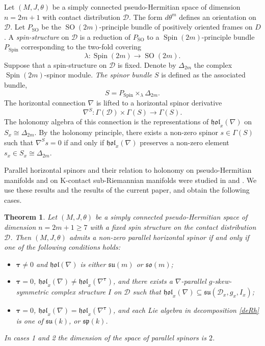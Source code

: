 \documentclass{amsart}
\theoremstyle{plain}
\newtheorem{theorem}{Theorem}[section]
\theoremstyle{definition}
\newcommand{\SO}{\operatorname{SO}}
\newcommand{\Spin}{\operatorname{Spin}}
\def\so{\mathfrak{so}}
\def\su{\mathfrak{su}}
\newcommand{\hol}{\mathfrak{hol}}
\newcommand{\bt}{{\boldsymbol{\tau}}}
\newcommand{\1}{\mathbf{1}}
\newcommand{\D}{{\mathcal D}}
\newcommand{\+}{\oplus}
\begin{document}
Let $(M,J,\theta)$ be a simply connected pseudo-Hermitian space of dimension $n=2m+1$ with contact distribution $\mathcal{D}$. 
The form $d\theta^m$ defines an orientation on $\D$. 
Let $P_{\SO}$ be the $\SO(2m)$-principle bundle of positively oriented frames on $D$.  
A {\it spin-structure} on $\D$ is a  reduction of $P_{\SO}$ to a $\Spin(2m)$-principle bundle $P_{\Spin}$ 
corresponding to the two-fold covering $$\lambda:\Spin(2m)\to\SO(2m).$$
Suppose that a spin-structure on $\D$ is fixed.
Denote by $\Delta_{2m}$ the complex 
$\Spin(2m)$-spinor module. {\it The spinor bundle} $S$  is defined as the associated bundle,
$$S=P_{\Spin}\times_\lambda \Delta_{2m}.$$
The horizontal connection $\nabla$ is lifted to a horizontal  spinor derivative
$$\nabla^S:\Gamma(\D)\times\Gamma(S)\to\Gamma(S).$$
The holonomy algebra of this connection is the representations of $\hol_x(\nabla)$ 
on $S_x\cong\Delta_{2m}$. By the holonomy principle, there exists a non-zero spinor 
$s\in \Gamma(S)$ such that $\nabla^S s=0$ if and only if $\hol_x(\nabla)$  preserves a non-zero element $s_x\in S_x\cong\Delta_{2m}$.

Parallel horizontal spinors and their relation to holonomy on pseudo-Hermitian manifolds and on K-contact sub-Riemannian manifolds 
were studied in \cite{Leitner18} and \cite{GalHolK}. We use these results and the results of the current paper, 
and obtain the following cases. 


\begin{theorem}\label{thparalspin} Let $(M,J,\theta)$ be a simply connected pseudo-Hermitian space of dimension $n=2m+1\geq 7$ 
	with a fixed spin structure on the contact distribution $\D$. 
	Then $(M,J,\theta)$ admits a non-zero parallel horizontal spinor if and only if one of the following conditions holds:
	\begin{itemize}
		\item[{\bf 1.}] $\bt\neq 0$ and $\hol(\nabla)$ is either $\su(m)$ or $\so(m)$; 
		\item[{\bf 2.}]  $\bt=0$, $\hol_x(\nabla)\neq\hol_x(\nabla^\bt)$, and there 
		exists a $\nabla$-parallel $g$-skew-symmetric complex structure $I$ on $\D$ such that $\hol_x(\nabla)\subseteq\su(\D_x,g_x,I_x)$; 
		\item[{\bf 3.}] $\bt=0$, $\hol_x(\nabla)=\hol_x(\nabla^\bt)$, and each 
		Lie algebra in decomposition \eqref{deRh} is one of $\su(k)$, or $\mathfrak{sp}(k)$.
	\end{itemize}
	In cases 1 and 2 the dimension of the space of parallel spinors is $2$.
\end{theorem}
\end{document}
